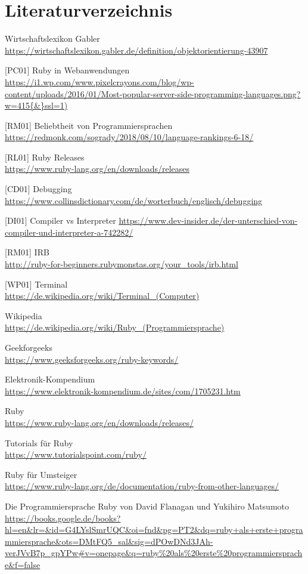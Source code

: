 \documentclass[12pt,DIV=14, version=first, BCOR=10mm,a4paper,twoside,parskip=half-,headsepline,headinclude]{scrartcl}
\begin{document}
\section{Literaturverzeichnis}
\begin{flushleft}
[WL01] Wirtschaftslexikon Gabler
\url {https://wirtschaftslexikon.gabler.de/definition/objektorientierung-43907}


[PC01] Ruby in Webanwendungen
\url {https://i1.wp.com/www.pixelcrayons.com/blog/wp-content/uploads/2016/01/Most-popular-server-side-programming-languages.png?w=415{\&}ssl=1)}


[RM01] Beliebtheit von Programmiersprachen
\url {https://redmonk.com/sogrady/2018/08/10/language-rankings-6-18/}


[RL01] Ruby Releases\\
\url {https://www.ruby-lang.org/en/downloads/releases}

[CD01] Debugging
\url {https://www.collinsdictionary.com/de/worterbuch/englisch/debugging}

[DI01] Compiler vs Interpreter
\url {https://www.dev-insider.de/der-unterschied-von-compiler-und-interpreter-a-742282/}

[RM01] IRB \\
\url {http://ruby-for-beginners.rubymonstas.org/your_tools/irb.html}

[WP01] Terminal \\
\url {https://de.wikipedia.org/wiki/Terminal_(Computer)}

Wikipedia \\
\url {https://de.wikipedia.org/wiki/Ruby_(Programmiersprache)}

Geekforgeeks \\
\url {https://www.geeksforgeeks.org/ruby-keywords/}

Elektronik-Kompendium \\
\url {https://www.elektronik-kompendium.de/sites/com/1705231.htm}

Ruby \\
\url {https://www.ruby-lang.org/en/downloads/releases/}

Tutorials für Ruby \\
\url {https://www.tutorialspoint.com/ruby/}

Ruby für Umsteiger \\
\url {https://www.ruby-lang.org/de/documentation/ruby-from-other-languages/}

Die Programmiersprache Ruby von David Flanagan und Yukihiro Matsumoto \\
\url {https://books.google.de/books?hl=en\&lr=&id=G4LYslSmrUQC\&oi=fnd\&pg=PT2\&dq=ruby+als+erste+programmiersprache\&ots=DMtFQ5_sal\&sig=dPOwDNd3JAh-verJVvB7p_gpYPw#v=onepage\&q=ruby%20als%20erste%20programmiersprache\&f=false}


\end{flushleft}


%
\end{document}
